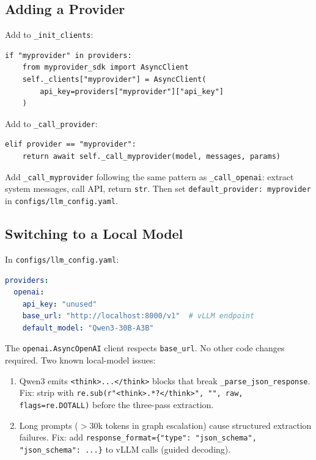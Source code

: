 \documentclass[11pt,a4paper]{article}
\begin{document}
\subsection{Adding a Provider}

Add to \texttt{\_init\_clients}:
\begin{lstlisting}[style=py]
if "myprovider" in providers:
    from myprovider_sdk import AsyncClient
    self._clients["myprovider"] = AsyncClient(
        api_key=providers["myprovider"]["api_key"]
    )
\end{lstlisting}

Add to \texttt{\_call\_provider}:
\begin{lstlisting}[style=py]
elif provider == "myprovider":
    return await self._call_myprovider(model, messages, params)
\end{lstlisting}

Add \texttt{\_call\_myprovider} following the same pattern as \texttt{\_call\_openai}: extract system messages, call API, return \texttt{str}. Then set \texttt{default\_provider: myprovider} in \texttt{configs/llm\_config.yaml}.

\subsection{Switching to a Local Model}

In \texttt{configs/llm\_config.yaml}:
\begin{lstlisting}[style=py, language=yaml]
providers:
  openai:
    api_key: "unused"
    base_url: "http://localhost:8000/v1"  # vLLM endpoint
    default_model: "Qwen3-30B-A3B"
\end{lstlisting}

The \texttt{openai.AsyncOpenAI} client respects \texttt{base\_url}. No other code changes required. Two known local-model issues:
\begin{enumerate}[leftmargin=*,noitemsep]
  \item Qwen3 emits \texttt{<think>...</think>} blocks that break \texttt{\_parse\_json\_response}. Fix: strip with \verb|re.sub(r"<think>.*?</think>", "", raw, flags=re.DOTALL)| before the three-pass extraction.
  \item Long prompts ($>$30k tokens in graph escalation) cause structured extraction failures. Fix: add \texttt{response\_format=\{"type": "json\_schema", "json\_schema": ...\}} to vLLM calls (guided decoding).
\end{enumerate}

\end{document}
